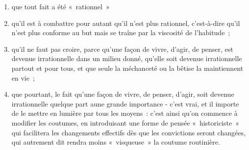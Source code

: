 \documentclass[french,twoside]{book} %
\begin{document}
\begin{enumerate}[itemsep=0pt,]
\item que tout fait a été « rationnel »
\item qu’il est à combattre pour autant qu’il n’est plus rationnel, c’est-à-dire qu’il n’est plus conforme au but mais se traîne par la viscosité de l’habitude ; 
\item qu’il ne faut pas croire, parce qu’une façon de vivre, d’agir, de penser, est devenue irrationnelle dans un milieu donné, qu’elle soit devenue irrationnelle partout et pour tous, et que seule la méchanceté ou la bêtise la maintiennent en vie ; 
\item que pourtant, le fait qu’une façon de vivre, de penser, d’agir, soit devenue irrationnelle quelque part aune grande importance - c’est vrai, et il importe de le mettre en lumière par tous les moyens : c’est ainsi qu’on commence à modifier les coutumes, en introduisant une forme de pensée « historiciste » qui facilitera les changements effectifs dès que les convictions seront changées, qui autrement dit rendra moins « visqueuse » la coutume routinière.
\end{enumerate}
\end{document}

